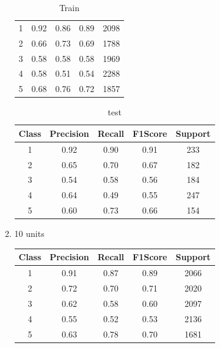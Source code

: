 \begin{enumerate}[label=(\alph*)]
\begin{enumerate}[label=\roman*.]
\begin{table}[!htb]
\begin{tabular}{ccccc}
            1     & 0.92      & 0.86   & 0.89    & 2098    \\
            2     & 0.66      & 0.73   & 0.69    & 1788    \\
            3     & 0.58      & 0.58   & 0.58    & 1969    \\
            4     & 0.58      & 0.51   & 0.54    & 2288    \\
            5     & 0.68      & 0.76   & 0.72    & 1857    \\ \hline
            \end{tabular}
            \caption{Train}
            \label{part b train depth 5}
        \end{table}
        \begin{table}[!htb]
            \centering
            \begin{tabular}{ccccc}
            \hline
            Class & Precision & Recall & F1Score & Support \\ \hline
            1     & 0.92      & 0.90   & 0.91    & 233     \\
            2     & 0.65      & 0.70   & 0.67    & 182     \\
            3     & 0.54      & 0.58   & 0.56    & 184     \\
            4     & 0.64      & 0.49   & 0.55    & 247     \\
            5     & 0.60      & 0.73   & 0.66    & 154     \\ \hline
            \end{tabular}
            \caption{test}
            \label{part b test depth 5}
        \end{table}
        \newpage
        \item 10 units
        \begin{table}[!htb]
            \centering
            \begin{tabular}{ccccc}
            \hline
            Class & Precision & Recall & F1Score & Support \\ \hline
            1     & 0.91      & 0.87   & 0.89    & 2066    \\
            2     & 0.72      & 0.70   & 0.71    & 2020    \\
            3     & 0.62      & 0.58   & 0.60    & 2097    \\
            4     & 0.55      & 0.52   & 0.53    & 2136    \\
            5     & 0.63      & 0.78   & 0.70    & 1681    \\ \hline

\end{tabular}
\end{table}
\end{enumerate}
\end{enumerate}
